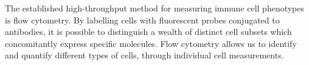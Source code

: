 



The established high-throughput method for measuring immune cell phenotypes is flow cytometry.
By labelling cells with fluorescent probes conjugated to antibodies, it is possible to distinguish a wealth of distinct cell
subsets which concomitantly express specific molecules.
Flow cytometry allows us to identify and quantify different types of cells, through individual cell measurements.

